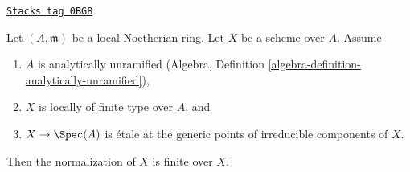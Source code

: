 \begin{lemma}
\label{resolve-lemma-formally-unramified}
\href{https://stacks.math.columbia.edu/tag/0BG8}{\texttt{Stacks tag 0BG8}}

Let $(A, \mathfrak m)$ be a local Noetherian ring. Let
$X$ be a scheme over $A$. Assume
\begin{enumerate}
\item $A$ is analytically unramified
(Algebra, Definition \ref{algebra-definition-analytically-unramified}),
\item $X$ is locally of finite type over $A$, and
\item $X \to \Spec(A)$ is \'etale at the generic points of irreducible
components of $X$.
\end{enumerate}
Then the normalization of $X$ is finite over $X$.
\end{lemma}

